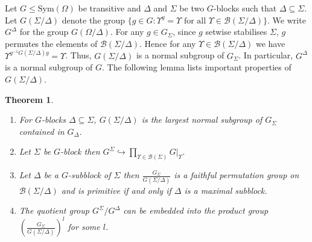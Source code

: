 \documentclass[11pt]{madras}%
\newtheorem{theorem}{Theorem}[chapter]
\theoremstyle{remark}
\newcommand{\Sym}[1]{{\ensuremath{\mathrm{Sym}\left(#1\right)}}}
\newcommand{\pr}[2]{{\ensuremath{\left.{#1}\right\vert_{#2}}}}
\newcommand{\Blocks}[1]{{\ensuremath{\mathcal{B}\left(#1\right)}}}
\newcommand{\Gof}[2][G]{{\ensuremath{#1\left(#2\right)}}}
\begin{document}
Let $G\leq\Sym{\Omega}$ be transitive and $\Delta$ and $\Sigma$ be two
$G$-blocks such that $\Delta\subseteq \Sigma$. Let
$\Gof{\Sigma/\Delta}$ denote the group $\{ g \in G : \Upsilon^g =
\Upsilon \textrm{ for all } \Upsilon \in \Blocks{\Sigma/\Delta} \}$.
We write $G^\Delta$ for the group $\Gof{\Omega/\Delta}$.  For any $g
\in G_\Sigma$, since $g$ setwise stabilises $\Sigma$, $g$ permutes the
elements of $\Blocks{\Sigma/\Delta}$. Hence for any $\Upsilon \in
\Blocks{\Sigma/\Delta}$ we have $\Upsilon^{g^{-1}\Gof{\Sigma/\Delta}g}
= \Upsilon$. Thus, $\Gof{\Sigma/\Delta}$ is a normal subgroup of
$G_\Sigma$.  In particular, $G^\Delta$ is a normal subgroup of $G$.
The following lemma lists important properties of
$\Gof{\Sigma/\Delta}$.%

\begin{theorem}\label{thm-gsupdelta}\hfill{~}
  \begin{enumerate}
  \item For $G$-blocks $\Delta \subseteq \Sigma$,
    $\Gof{\Sigma/\Delta}$ is the largest normal subgroup of $G_\Sigma$
    contained in $G_\Delta$.

  \item Let $\Sigma$ be $G$-block then $G^{\Sigma} \hookrightarrow
    \prod_{\Upsilon \in \Blocks{\Sigma}} \pr{G}{\Upsilon}$.

  \item Let $\Delta$ be a $G$-subblock of $\Sigma$ then
    $\frac{G_\Sigma}{\Gof{\Sigma/\Delta}}$ is a faithful permutation
    group on $\Blocks{\Sigma/\Delta}$ and is primitive if and only if
    $\Delta$ is a maximal subblock.

  \item The quotient group $G^\Sigma/G^\Delta$ can be embedded into
    the product group
    $\left(\frac{G_\Sigma}{\Gof{\Sigma/\Delta}}\right)^l$ for some
    $l$.

\end{enumerate}
\end{theorem}
\end{document}
